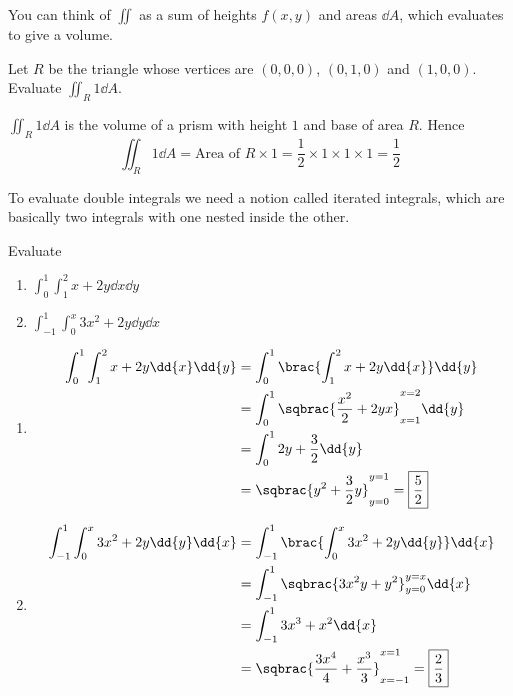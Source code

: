 \begin{remark}
You can think of $\iint$ as a sum of heights $f(x,y)$ and areas $\dd{A}$, which evaluates to give a volume.
\end{remark}

\begin{exercise}
Let $R$ be the triangle whose vertices are $(0,0,0)$, $(0,1,0)$ and $(1,0,0)$. Evaluate $\iint_R1\dd{A}$.
\end{exercise}

\begin{solution}
$\iint_R1\dd{A}$ is the volume of a prism with height $1$ and base of area $R$. Hence
\[ \iint_R1\dd{A}=\text{Area of }R\times1=\frac{1}{2}\times1\times1\times1=\boxed{\frac{1}{2}} \]
\end{solution}

To evaluate double integrals we need a notion called iterated integrals, which are basically two integrals with one nested inside the other.

\begin{exercise}
Evaluate 
\begin{enumerate}[label=(\alph*)]
\item $\displaystyle\int_0^1\int_1^2x+2y\dd{x}\dd{y}$
\item $\displaystyle\int_{-1}^1\int_0^x3x^2+2y\dd{y}\dd{x}$
\end{enumerate}
\end{exercise}

\begin{solution}
\begin{enumerate}[label=(\alph*)]
\item 
\begin{align*}
\int_0^1\int_1^2x+2y\dd{x}\dd{y}
&= \int_0^1\brac{\int_1^2x+2y\dd{x}}\dd{y} \\
&= \int_0^1\sqbrac{\frac{x^2}{2}+2yx}_{x=1}^{x=2}\dd{y} \\
&= \int_0^12y+\frac{3}{2}\dd{y} \\
&= \sqbrac{y^2+\frac{3}{2}y}_{y=0}^{y=1}=\boxed{\frac{5}{2}}
\end{align*}

\item 
\begin{align*}
\int_{-1}^1\int_0^x3x^2+2y\dd{y}\dd{x}
&= \int_{-1}^1\brac{\int_0^x3x^2+2y\dd{y}}\dd{x} \\
&= \int_{-1}^1\sqbrac{3x^2y+y^2}_{y=0}^{y=x}\dd{x} \\
&= \int_{-1}^13x^3+x^2\dd{x} \\
&= \sqbrac{\frac{3x^4}{4}+\frac{x^3}{3}}_{x=-1}^{x=1}=\boxed{\frac{2}{3}}
\end{align*}
\end{enumerate}
\end{solution}


